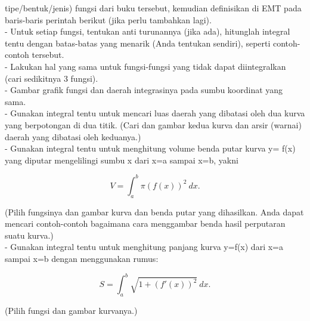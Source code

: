 \documentclass[a4paper,10pt]{article}
\begin{document}
\begin{eulernotebook}
\begin{eulercomment}
\begin{eulercomment}
\begin{eulercomment}
tipe/bentuk/jenis) fungsi dari buku tersebut, kemudian definisikan di
EMT pada baris-baris perintah berikut (jika perlu tambahkan lagi).\\
- Untuk setiap fungsi, tentukan anti turunannya (jika ada), hitunglah
integral tentu dengan batas-batas yang menarik (Anda tentukan
sendiri), seperti contoh-contoh tersebut.\\
- Lakukan hal yang sama untuk fungsi-fungsi yang tidak dapat
diintegralkan (cari sedikitnya 3 fungsi).\\
- Gambar grafik fungsi dan daerah integrasinya pada sumbu koordinat
yang sama.\\
- Gunakan integral tentu untuk mencari luas daerah yang dibatasi oleh
dua kurva yang berpotongan di dua titik. (Cari dan gambar kedua kurva
dan arsir (warnai) daerah yang dibatasi oleh keduanya.)\\
- Gunakan integral tentu untuk menghitung volume benda putar kurva y=
f(x) yang diputar mengelilingi sumbu x dari x=a sampai x=b, yakni

\end{eulercomment}
\begin{eulerformula}
\[
V = \int_a^b \pi (f(x))^2\ dx.
\]
\end{eulerformula}
\begin{eulercomment}
(Pilih fungsinya dan gambar kurva dan benda putar yang dihasilkan.
Anda dapat mencari contoh-contoh bagaimana cara menggambar benda hasil
perputaran suatu kurva.)\\
- Gunakan integral tentu untuk menghitung panjang kurva y=f(x) dari
x=a sampai x=b dengan menggunakan rumus:

\end{eulercomment}
\begin{eulerformula}
\[
S = \int_a^b \sqrt{1+(f'(x))^2} \ dx.
\]
\end{eulerformula}
\begin{eulercomment}
(Pilih fungsi dan gambar kurvanya.)


\end{eulercomment}
\end{eulercomment}
\end{eulercomment}
\end{eulernotebook}
\end{document}

